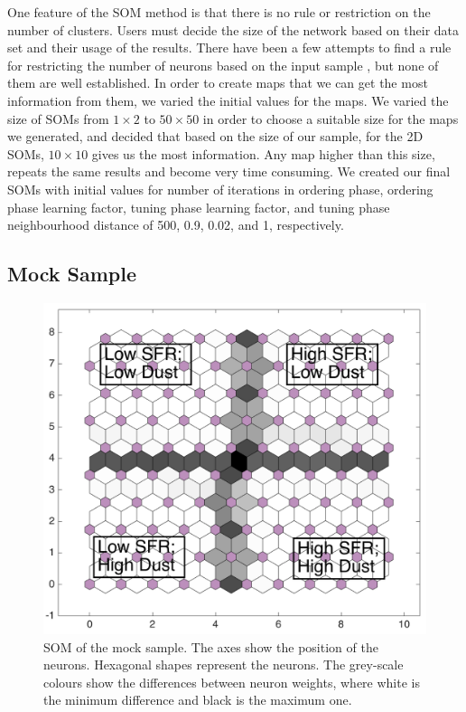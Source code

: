      One feature of the SOM method is that there is no rule or restriction on the number of clusters.
     Users must decide the size of the network based on their data set and their usage of the results.
     There have been a few attempts to find a rule for restricting the number of neurons based on the input sample \citep[e.g.][]{Vesanto05}, but none of them are well established. 
     In order to create maps that we can get the most information from them, we varied the initial values for the maps.
     We varied the size of SOMs from $1\times2$ to $50\times50$ in order to choose a suitable size for the maps we generated, and decided that based on the size of our sample, for the 2D SOMs, $10\times10$ gives us the most information.
     Any map higher than this size, repeats the same results and become very time consuming.
     We created our final SOMs with initial values for number of iterations in ordering phase, ordering phase learning factor, tuning phase learning factor, and tuning phase neighbourhood distance of 500, 0.9, 0.02, and 1, respectively. 
    

\subsection{Mock Sample}
\label{sec: mock_sample}
 
         \begin{figure}
                \centering
                \includegraphics[width=\textwidth]{../image_paper3/images0.01/mock_sample.png}
            \caption[Self-organizing map of the mock sample]{SOM of the mock sample. The axes show the position of the neurons. Hexagonal shapes represent the neurons. The grey-scale colours show the differences between neuron weights, where white is the minimum difference and black is the maximum one.}
            \label{fig: sample}
        \end{figure}
 
